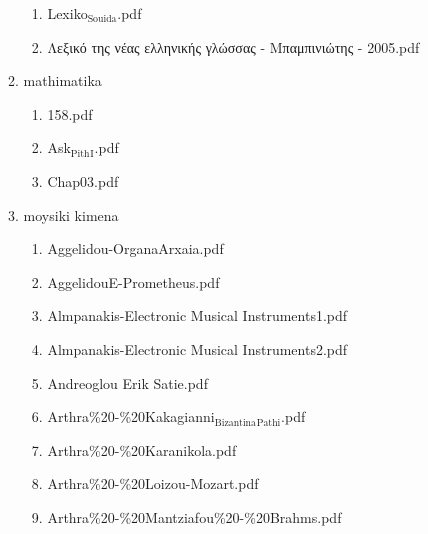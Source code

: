 \documentclass[11pt]{article}
\begin{document}
\begin{enumerate}
\begin{enumerate}
\begin{enumerate}
\item Lexiko$_{\text{Souida}}$.pdf
\label{sec-1-1-1-1-49-2-2-1-70-2}

\item Λεξικό της νέας ελληνικής γλώσσας - Μπαμπινιώτης - 2005.pdf
\label{sec-1-1-1-1-49-2-2-1-70-3}
\end{enumerate}

\item mathimatika
\label{sec-1-1-1-1-49-2-2-1-71}
\begin{enumerate}
\item 158.pdf
\label{sec-1-1-1-1-49-2-2-1-71-1}

\item Ask$_{\text{Pith}}$$_{\text{I}}$.pdf
\label{sec-1-1-1-1-49-2-2-1-71-2}

\item Chap03.pdf
\label{sec-1-1-1-1-49-2-2-1-71-3}
\end{enumerate}

\item moysiki kimena
\label{sec-1-1-1-1-49-2-2-1-72}
\begin{enumerate}
\item Aggelidou-OrganaArxaia.pdf
\label{sec-1-1-1-1-49-2-2-1-72-1}

\item AggelidouE-Prometheus.pdf
\label{sec-1-1-1-1-49-2-2-1-72-2}

\item Almpanakis-Electronic Musical Instruments1.pdf
\label{sec-1-1-1-1-49-2-2-1-72-3}

\item Almpanakis-Electronic Musical Instruments2.pdf
\label{sec-1-1-1-1-49-2-2-1-72-4}

\item Andreoglou  Erik Satie.pdf
\label{sec-1-1-1-1-49-2-2-1-72-5}

\item Arthra\%20-\%20Kakagianni$_{\text{Bizantina}}$$_{\text{Pathi}}$.pdf
\label{sec-1-1-1-1-49-2-2-1-72-6}

\item Arthra\%20-\%20Karanikola.pdf
\label{sec-1-1-1-1-49-2-2-1-72-7}

\item Arthra\%20-\%20Loizou-Mozart.pdf
\label{sec-1-1-1-1-49-2-2-1-72-8}

\item Arthra\%20-\%20Mantziafou\%20-\%20Brahms.pdf
\label{sec-1-1-1-1-49-2-2-1-72-9}


\end{enumerate}
\end{enumerate}
\end{enumerate}
\end{document}
